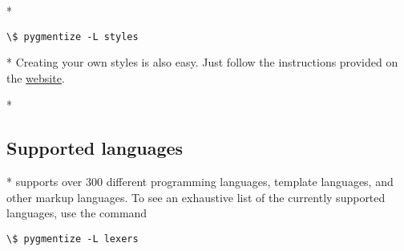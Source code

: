 \begin{paracol}{2}
\switchcolumn[0]*%
\begin{Verbatim}[commandchars=\\\{\}]
\$ pygmentize -L styles
\end{Verbatim}

\switchcolumn

\switchcolumn[0]*%
Creating your own styles is also easy. Just follow the instructions provided on the
\href{http://pygments.org/docs/styles/#creating-own-styles}{ website}.

\switchcolumn

\switchcolumn[0]*%
\subsection{Supported languages}
\switchcolumn

\switchcolumn[0]*%
 supports over 300 different programming languages, template languages, and other markup languages.  To see an exhaustive list of the currently supported languages, use the command

\begin{Verbatim}[commandchars=\\\{\}]
\$ pygmentize -L lexers
\end{Verbatim}

\end{paracol}